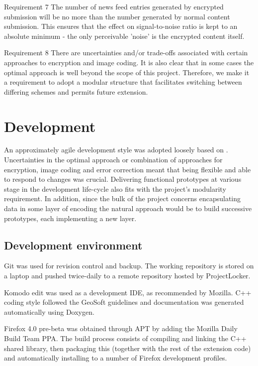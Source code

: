 \begin{desc}
    \item[Requirement 7] The number of news feed entries generated by encrypted submission will be no more than the number generated by normal content submission. This ensures that the effect on signal-to-noise ratio is kept to an absolute minimum - the only perceivable 'noise' is the encrypted content itself.
    

    \item[Requirement 8] There are uncertainties and/or trade-offs associated with certain approaches to encryption and image coding. It is also clear that in some cases the optimal approach is well beyond the scope of this project. Therefore, we make it a requirement to adopt a modular structure that facilitates switching between differing schemes and permits future extension.
    
\end{desc}


   
\FloatBarrier 
\section{Development}
        
An approximately agile development style was adopted loosely based on \cite{agile}. Uncertainties in the optimal approach or combination of approaches for encryption, image coding and error correction meant that being flexible and able to respond to changes was crucial. Delivering functional prototypes at various stage in the development life-cycle also fits with the project's modularity requirement. In addition, since the bulk of the project concerns encapsulating data in some layer of encoding the natural approach would be to build successive prototypes, each implementing a new layer.

\subsection{Development environment}

Git was used for revision control and backup. The working repository is stored on a laptop and pushed twice-daily to a remote repository hosted by ProjectLocker.

Komodo edit was used as a development IDE, as recommended by Mozilla. C++ coding style followed the GeoSoft guidelines \cite{code-style} and documentation was generated automatically using Doxygen.

Firefox 4.0 pre-beta was obtained through APT by adding the Mozilla Daily Build Team PPA. The build process consists of compiling and linking the C++ shared library, then packaging this (together with the rest of the extension code) and automatically installing to a number of Firefox development profiles.        

